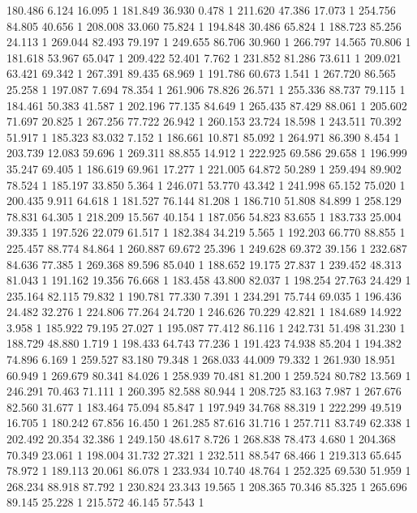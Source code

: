 	180.486	6.124	16.095	1
	181.849	36.930	0.478	1
	211.620	47.386	17.073	1
	254.756	84.805	40.656	1
	208.008	33.060	75.824	1
	194.848	30.486	65.824	1
	188.723	85.256	24.113	1
	269.044	82.493	79.197	1
	249.655	86.706	30.960	1
	266.797	14.565	70.806	1
	181.618	53.967	65.047	1
	209.422	52.401	7.762	1
	231.852	81.286	73.611	1
	209.021	63.421	69.342	1
	267.391	89.435	68.969	1
	191.786	60.673	1.541	1
	267.720	86.565	25.258	1
	197.087	7.694	78.354	1
	261.906	78.826	26.571	1
	255.336	88.737	79.115	1
	184.461	50.383	41.587	1
	202.196	77.135	84.649	1
	265.435	87.429	88.061	1
	205.602	71.697	20.825	1
	267.256	77.722	26.942	1
	260.153	23.724	18.598	1
	243.511	70.392	51.917	1
	185.323	83.032	7.152	1
	186.661	10.871	85.092	1
	264.971	86.390	8.454	1
	203.739	12.083	59.696	1
	269.311	88.855	14.912	1
	222.925	69.586	29.658	1
	196.999	35.247	69.405	1
	186.619	69.961	17.277	1
	221.005	64.872	50.289	1
	259.494	89.902	78.524	1
	185.197	33.850	5.364	1
	246.071	53.770	43.342	1
	241.998	65.152	75.020	1
	200.435	9.911	64.618	1
	181.527	76.144	81.208	1
	186.710	51.808	84.899	1
	258.129	78.831	64.305	1
	218.209	15.567	40.154	1
	187.056	54.823	83.655	1
	183.733	25.004	39.335	1
	197.526	22.079	61.517	1
	182.384	34.219	5.565	1
	192.203	66.770	88.855	1
	225.457	88.774	84.864	1
	260.887	69.672	25.396	1
	249.628	69.372	39.156	1
	232.687	84.636	77.385	1
	269.368	89.596	85.040	1
	188.652	19.175	27.837	1
	239.452	48.313	81.043	1
	191.162	19.356	76.668	1
	183.458	43.800	82.037	1
	198.254	27.763	24.429	1
	235.164	82.115	79.832	1
	190.781	77.330	7.391	1
	234.291	75.744	69.035	1
	196.436	24.482	32.276	1
	224.806	77.264	24.720	1
	246.626	70.229	42.821	1
	184.689	14.922	3.958	1
	185.922	79.195	27.027	1
	195.087	77.412	86.116	1
	242.731	51.498	31.230	1
	188.729	48.880	1.719	1
	198.433	64.743	77.236	1
	191.423	74.938	85.204	1
	194.382	74.896	6.169	1
	259.527	83.180	79.348	1
	268.033	44.009	79.332	1
	261.930	18.951	60.949	1
	269.679	80.341	84.026	1
	258.939	70.481	81.200	1
	259.524	80.782	13.569	1
	246.291	70.463	71.111	1
	260.395	82.588	80.944	1
	208.725	83.163	7.987	1
	267.676	82.560	31.677	1
	183.464	75.094	85.847	1
	197.949	34.768	88.319	1
	222.299	49.519	16.705	1
	180.242	67.856	16.450	1
	261.285	87.616	31.716	1
	257.711	83.749	62.338	1
	202.492	20.354	32.386	1
	249.150	48.617	8.726	1
	268.838	78.473	4.680	1
	204.368	70.349	23.061	1
	198.004	31.732	27.321	1
	232.511	88.547	68.466	1
	219.313	65.645	78.972	1
	189.113	20.061	86.078	1
	233.934	10.740	48.764	1
	252.325	69.530	51.959	1
	268.234	88.918	87.792	1
	230.824	23.343	19.565	1
	208.365	70.346	85.325	1
	265.696	89.145	25.228	1
	215.572	46.145	57.543	1
